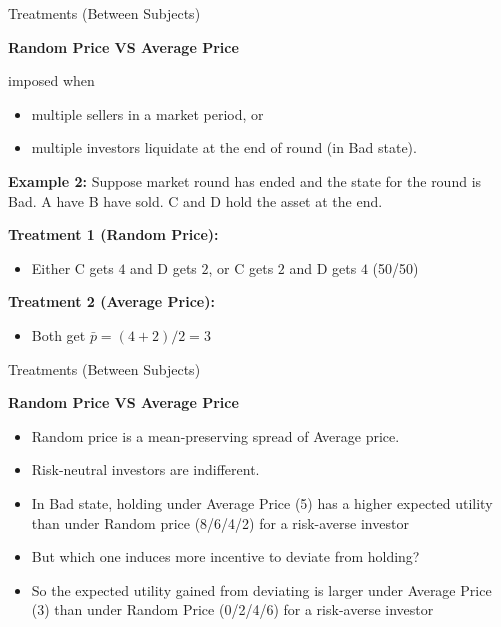 \documentclass{beamer}
\begin{document}
\begin{frame}{Treatments (Between Subjects)}

\textbf{Random Price VS Average Price}

imposed when 
\begin{itemize}
    \item multiple sellers in a market period, or 
    \item multiple investors liquidate at the end of round (in Bad state).
\end{itemize}

\vspace{0.2in}

\textbf{Example 2:} Suppose market round has ended and the state for the round is Bad.  A have B have sold. C and D hold the asset at the end.

\vspace{0.1in}

\textbf{Treatment 1 (Random Price):}
\begin{itemize}
    \item Either C gets $4$ and D gets $2$, or C gets $2$ and D gets $4$ (50/50)
\end{itemize}

\vspace{0.1in}

\textbf{Treatment 2 (Average Price):}
\begin{itemize}
    \item Both get $\bar{p} = (4+2)/2 = 3$
\end{itemize}

\end{frame}

\begin{frame}{Treatments (Between Subjects)}

\textbf{Random Price VS Average Price}

\begin{itemize}
    \item Random price is a mean-preserving spread of Average price.
    \item Risk-neutral investors are indifferent.
    \item In Bad state, holding under Average Price (5) has a higher expected utility than under Random price (8/6/4/2) for a risk-averse investor
    \item But which one induces more incentive to deviate from holding?
    \item So the expected utility gained from deviating is larger under Average Price (3) than  under Random Price (0/2/4/6) for a risk-averse investor
\end{itemize}




\end{frame}
\end{document}
